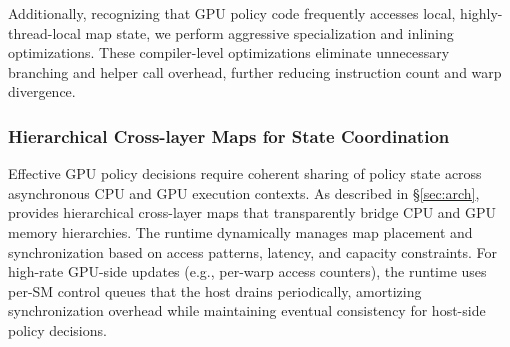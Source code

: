 Additionally, recognizing that GPU policy code frequently accesses local, highly-thread-local map state, we perform aggressive specialization and inlining optimizations. These compiler-level optimizations eliminate unnecessary branching and helper call overhead, further reducing instruction count and warp divergence.

\subsubsection{Hierarchical Cross-layer Maps for State Coordination}

Effective GPU policy decisions require coherent sharing of policy state across asynchronous CPU and GPU execution contexts. As described in \S\ref{sec:arch}, \sys provides hierarchical cross-layer maps that transparently bridge CPU and GPU memory hierarchies. The runtime dynamically manages map placement and synchronization based on access patterns, latency, and capacity constraints. For high-rate GPU-side updates (e.g., per-warp access counters), the runtime uses per-SM control queues that the host drains periodically, amortizing synchronization overhead while maintaining eventual consistency for host-side policy decisions.

